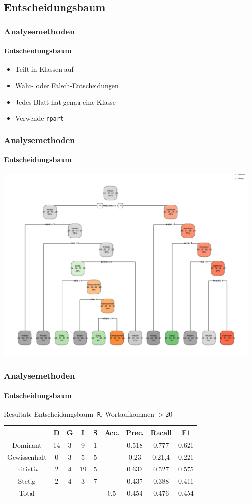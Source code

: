 \subsection{Entscheidungsbaum}
\begin{frame}
\frametitle{Analysemethoden}
\framesubtitle{Entscheidungsbaum}
\begin{itemize}\setlength\parskip{12pt}
\item Teilt in Klassen auf
\item Wahr- oder Falsch-Entscheidungen
\item Jedes Blatt hat genau eine Klasse
\item Verwende \texttt{rpart}
\end{itemize}
\end{frame}

\begin{frame}
\frametitle{Analysemethoden}
\framesubtitle{Entscheidungsbaum}
\begin{center}
	\includegraphics[scale=0.5]{Rplot.pdf}
\end{center}

\end{frame}
\begin{frame}
\frametitle{Analysemethoden}
\framesubtitle{Entscheidungsbaum}
Resultate Entscheidungsbaum, \texttt{R}, Wortaufkommen $> 20$
\begin{center}
\begin{tabular}{|c|c|c|c|c|c|c|c|c|}
\hline
 &  D 	& G	& I & S	& Acc.	& Prec. & Recall	& F1\\
\hline
Dominant & 14 & 3 & 9 & 1 & & 0.518 & 0.777 & 0.621 \\
Gewissenhaft & 0 & 3 & 5 & 5& &0.23 & 0.21,4 & 0.221\\
Initiativ & 2 & 4 & 19 & 5& & 0.633& 0.527 & 0.575\\
Stetig & 2 & 4 & 3 & 7& &0.437 & 0.388& 0.411 \\
\hline
Total 	&		&		& & 		& 0.5	& 0.454& 0.476 & 0.454\\
\hline
\end{tabular}
\end{center}
\end{frame}

